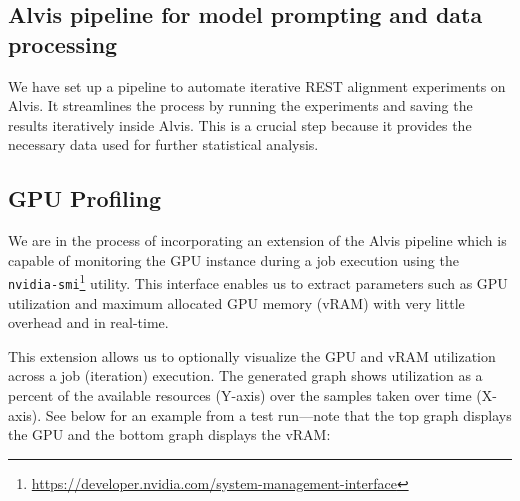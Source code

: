 \documentclass[conference]{IEEEtran}
\begin{document}
\subsection{Alvis pipeline for model prompting and data processing}\label{sec:progress-alvis-pipeline}

We have set up a pipeline to automate iterative REST alignment experiments on Alvis. It streamlines the process by running the experiments and saving the results iteratively  inside Alvis. This is a crucial step because it provides the necessary data used for further statistical analysis.

\subsection{GPU Profiling}

We are in the process of incorporating an extension of the Alvis pipeline which is capable of monitoring the GPU instance during a job execution using the \verb|nvidia-smi|\footnote{\url{https://developer.nvidia.com/system-management-interface}} utility. This interface enables us to extract parameters such as GPU utilization and maximum allocated GPU memory (vRAM) with very little overhead and in real-time.


This extension allows us to optionally visualize the GPU and vRAM utilization across a job (iteration) execution. The generated graph shows utilization as a percent of the available resources (Y-axis) over the samples taken over time (X-axis). See below for an example from a test run---note that the top graph displays the GPU and the bottom graph displays the vRAM:
\end{document}
